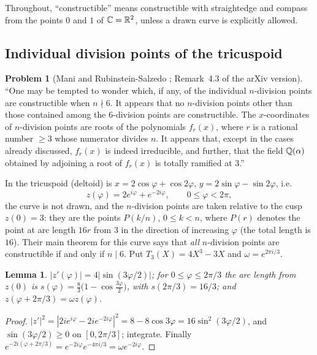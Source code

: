 \documentclass[11pt]{amsart}
\newtheorem{lemma}[theorem]{Lemma}
\theoremstyle{definition}
\newtheorem{problem}[theorem]{Problem}
\theoremstyle{remark}
\begin{document}
Throughout, ``constructible'' means constructible with straightedge and
compass from the points $0$ and $1$ of $\mathbb{C}=\mathbb{R}^2$, unless a drawn curve
is explicitly allowed.

\subsection{Individual division points of the tricuspoid}
\label{R7-ssec-tricuspoid}

\begin{problem}[{Mani and Rubinstein-Salzedo \cite[Remark~5.7]{R7-MRS16}; Remark~4.3 of the arXiv version}]
\label{R7-prob-MRS-tri}
``One may be tempted to wonder which, if any, of the individual
$n$-division points are constructible when $n\nmid 6$. It appears that no
$n$-division points other than those contained among the $6$-division points
are constructible. The $x$-coordinates of $n$-division points are roots of
the polynomials $f_r(x)$, where $r$ is a rational number $\ge 3$ whose
numerator divides $n$. It appears that, except in the cases already
discussed, $f_r(x)$ is indeed irreducible, and further, that the field
$\mathbb{Q}(\alpha)$ obtained by adjoining a root of $f_r(x)$ is totally ramified
at $3$.''
\end{problem}

In \cite{R7-MRS16} the tricuspoid (deltoid) is
$x=2\cos\varphi+\cos2\varphi$, $y=2\sin\varphi-\sin2\varphi$, i.e.
\[
 z(\varphi)=2e^{i\varphi}+e^{-2i\varphi},\qquad 0\le\varphi<2\pi ,
\]
the curve is not drawn, and the $n$-division points are taken relative to
the cusp $z(0)=3$: they are the points $P(k/n)$, $0\le k<n$, where
$P(r)$ denotes the point at arc length $16r$ from $3$ in the direction of
increasing $\varphi$ (the total length is $16$). Their main theorem for this
curve \cite[Theorem~5.1]{R7-MRS16} says that \emph{all} $n$-division points
are constructible if and only if $n\mid 6$. Put $T_3(X)=4X^3-3X$ and
$\omega=e^{2\pi i/3}$.

\begin{lemma}\label{R7-lem-tri-arc}
$|z'(\varphi)|=4|\sin(3\varphi/2)|$; for $0\le\varphi\le 2\pi/3$ the arc
length from $z(0)$ is $s(\varphi)=\tfrac83\bigl(1-\cos\tfrac{3\varphi}2\bigr)$,
with $s(2\pi/3)=16/3$; and $z(\varphi+2\pi/3)=\omega z(\varphi)$.
\end{lemma}

\begin{proof}
$|z'|^2=|2ie^{i\varphi}-2ie^{-2i\varphi}|^2=8-8\cos3\varphi=16\sin^2(3\varphi/2)$,
and $\sin(3\varphi/2)\ge0$ on $[0,2\pi/3]$; integrate. Finally
$e^{-2i(\varphi+2\pi/3)}=e^{-2i\varphi}e^{-4\pi i/3}=\omega e^{-2i\varphi}$.
\end{proof}
\end{document}
